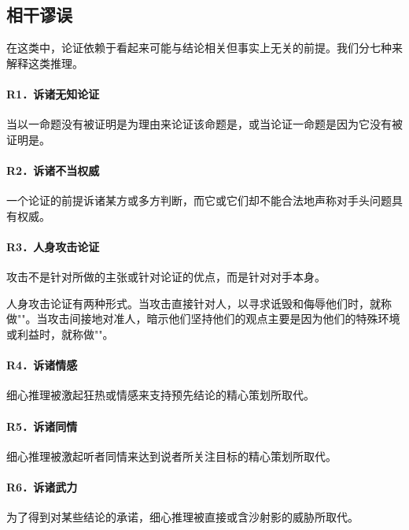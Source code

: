 
\subsection*{相干谬误}
在这类中，论证依赖于看起来可能与结论相关但事实上无关的前提。我们分七种来解释这类推理。

\paragraph{R1．诉诸无知论证}
当以一命题没有被证明是为理由来论证该命题是，或当论证一命题是因为它没有被证明是。

\paragraph{R2．诉诸不当权威}
一个论证的前提诉诸某方或多方判断，而它或它们却不能合法地声称对手头问题具有权威。

\paragraph{R3．人身攻击论证}
攻击不是针对所做的主张或针对论证的优点，而是针对对手本身。

人身攻击论证有两种形式。当攻击直接针对人，以寻求诋毁和侮辱他们时，就称做""。当攻击间接地对准人，暗示他们坚持他们的观点主要是因为他们的特殊环境或利益时，就称做""。

\paragraph{R4．诉诸情感}
细心推理被激起狂热或情感来支持预先结论的精心策划所取代。

\paragraph{R5．诉诸同情}
细心推理被激起听者同情来达到说者所关注目标的精心策划所取代。

\paragraph{R6．诉诸武力}
为了得到对某些结论的承诺，细心推理被直接或含沙射影的威胁所取代。

